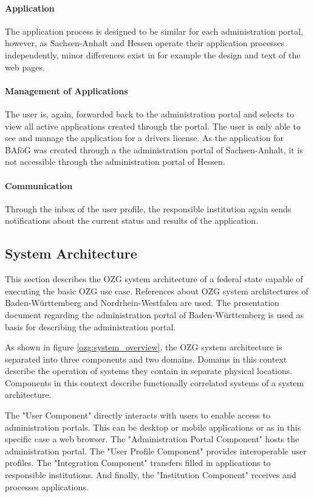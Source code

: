 \paragraph{Application} The application process is designed to be similar for each administration portal, however, as Sachsen-Anhalt and Hessen operate their application processes independently, minor differences exist in for example the design and text of the web pages.

\paragraph{Management of Applications} The user is, again, forwarded back to the administration portal and selects to view all active applications created through the portal. The user is only able to see and manage the application for a drivers license. As the application for BAföG was created through a the administration portal of Sachsen-Anhalt, it is not accessible through the administration portal of Hessen.

\paragraph{Communication} Through the inbox of the user profile, the responsible institution again sends notifications about the current status and results of the application.

\subsection{System Architecture}
This section describes the OZG system architecture of a federal state capable of executing the basic OZG use case. References about OZG system architectures of Baden-Württemberg \cite{ozg:bw} and Nordrhein-Westfalen \cite{ozg:nrw} are used. The presentation document regarding the administration portal of Baden-Württemberg \cite{ozg:bw_administration_portal} is used as basis for describing the administration portal.

As shown in figure \ref{ozg:system_overview}, the OZG system architecture is separated into three components and two domains. Domains in this context describe the operation of systems they contain in separate physical locations. Components in this context describe functionally correlated systems of a system architecture.

The "User Component" directly interacts with users to enable access to administration portals. This can be desktop or mobile applications or as in this specific case a web browser. The "Administration Portal Component" hosts the administration portal. The "User Profile Component" provides interoperable user profiles. The "Integration Component" transfers filled in applications to responsible institutions. And finally, the "Institution Component" receives and processes applications.

